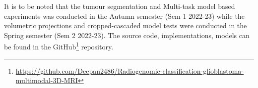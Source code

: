 It is to be noted that the tumour segmentation and Multi-task model based experiments was conducted in the Autumn semester (Sem 1 2022-23) while the volumetric projections and cropped-cascaded model tests were conducted in the Spring semester (Sem 2 2022-23). The source code, implementations, models can be found in the GitHub\footnote{\href{https://github.com/Deepan2486/Radiogenomic-classification-glioblastoma-multimodal-3D-MRI}{https://github.com/Deepan2486/Radiogenomic-classification-glioblastoma-multimodal-3D-MRI}} repository.






\ifpdf
\fi


